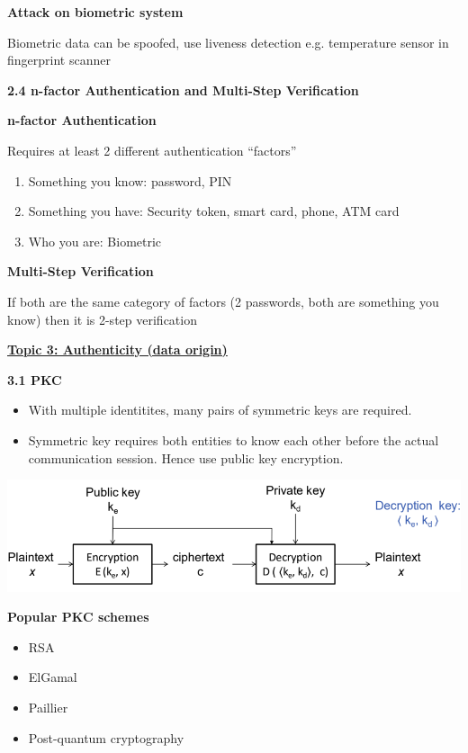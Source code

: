 \documentclass[landscape,a4paper]{extarticle}
\newenvironment{Figure}
  {\par\noindent\minipage{\linewidth}}
  {\endminipage\par\medskip}
\begin{document}
\begin{multicols*}{5}
    \textbf{Attack on biometric system}

    Biometric data can be spoofed, use liveness detection e.g. temperature sensor in fingerprint scanner

    \textbf{2.4 n-factor Authentication and Multi-Step Verification}

    \textbf{n-factor Authentication}

    Requires at least 2 different authentication ``factors''

    \begin{enumerate}
        \item Something you know: password, PIN
        \item Something you have: Security token, smart card, phone, ATM card
        \item Who you are: Biometric
    \end{enumerate}

    \textbf{Multi-Step Verification}

    If both are the same category of factors (2 passwords, both are something you know) 
    then it is 2-step verification

    \textbf{\uline{Topic 3: Authenticity (data origin)}}

    \textbf{3.1 PKC}

    \begin{itemize}
        \item With multiple identitites, many pairs of symmetric keys are required.
        \item Symmetric key requires both entities to know each other before the actual
        communication session. Hence use public key encryption.
    \end{itemize}

    \begin{Figure}
        \centering
        \includegraphics[width=\linewidth]{public_key_encryption.png}
    \end{Figure}

    \textbf{Popular PKC schemes}
    \begin{itemize}
        \item RSA
        \item ElGamal
        \item Paillier
        \item Post-quantum cryptography
    \end{itemize}


\end{multicols*}
\end{document}
